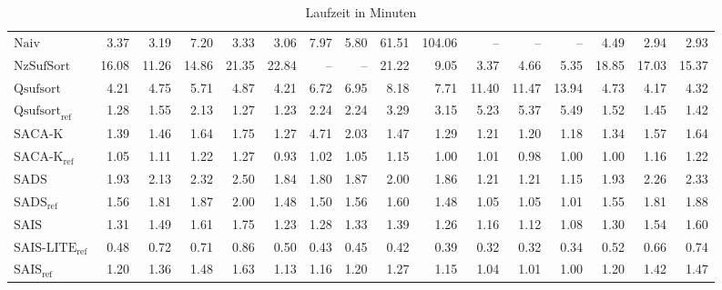 \begin{table}
{\begin{tabular}{lrrrrrrrrrrrrrrr}
    $\text{Naiv}$ & 3.37 & 3.19 & 7.20 & 3.33 & 3.06 & 7.97 & 5.80 & {\color{red}61.51} & {\color{red}104.06} & {\color{darkgray}--} & {\color{darkgray}--} & {\color{darkgray}--} & 4.49 & 2.94 & 2.93 \\
    $\text{NzSufSort}$ & {\color{red}16.08} & {\color{red}11.26} & {\color{red}14.86} & {\color{red}21.35} & {\color{red}22.84} & {\color{darkgray}--} & {\color{darkgray}--} & {\color{red}21.22} & 9.05 & 3.37 & 4.66 & 5.35 & {\color{red}18.85} & {\color{red}17.03} & {\color{red}15.37} \\
    $\text{Qsufsort}$ & 4.21 & 4.75 & 5.71 & 4.87 & 4.21 & 6.72 & 6.95 & 8.18 & 7.71 & 11.40 & {\color{red}11.47} & {\color{red}13.94} & 4.73 & 4.17 & 4.32 \\
    $\text{Qsufsort}_{\text{ref}}$ & 1.28 & 1.55 & 2.13 & 1.27 & 1.23 & 2.24 & 2.24 & 3.29 & 3.15 & 5.23 & 5.37 & 5.49 & 1.52 & 1.45 & 1.42 \\
    $\text{SACA-K}$ & 1.39 & 1.46 & 1.64 & 1.75 & 1.27 & 4.71 & 2.03 & 1.47 & 1.29 & 1.21 & 1.20 & 1.18 & 1.34 & 1.57 & 1.64 \\
    $\text{SACA-K}_{\text{ref}}$ & 1.05 & 1.11 & 1.22 & 1.27 & 0.93 & 1.02 & 1.05 & 1.15 & 1.00 & 1.01 & 0.98 & 1.00 & 1.00 & 1.16 & 1.22 \\
    $\text{SADS}$ & 1.93 & 2.13 & 2.32 & 2.50 & 1.84 & 1.80 & 1.87 & 2.00 & 1.86 & 1.21 & 1.21 & 1.15 & 1.93 & 2.26 & 2.33 \\
    $\text{SADS}_{\text{ref}}$ & 1.56 & 1.81 & 1.87 & 2.00 & 1.48 & 1.50 & 1.56 & 1.60 & 1.48 & 1.05 & 1.05 & 1.01 & 1.55 & 1.81 & 1.88 \\
    $\text{SAIS}$ & 1.31 & 1.49 & 1.61 & 1.75 & 1.23 & 1.28 & 1.33 & 1.39 & 1.26 & 1.16 & 1.12 & 1.08 & 1.30 & 1.54 & 1.60 \\
    $\text{SAIS-LITE}_{\text{ref}}$ & {\color{green!60!black}0.48} & 0.72 & 0.71 & 0.86 & 0.50 & {\color{green!60!black}0.43} & {\color{green!60!black}0.45} & {\color{green!60!black}0.42} & {\color{green!60!black}0.39} & {\color{green!60!black}0.32} & {\color{green!60!black}0.32} & {\color{green!60!black}0.34} & {\color{green!60!black}0.52} & 0.66 & 0.74 \\
    $\text{SAIS}_{\text{ref}}$ & 1.20 & 1.36 & 1.48 & 1.63 & 1.13 & 1.16 & 1.20 & 1.27 & 1.15 & 1.04 & 1.01 & 1.00 & 1.20 & 1.42 & 1.47 \\
\bottomrule
\end{tabular}
}
\caption{Laufzeit in Minuten}
\label{messung:tab:duration}
\end{table}

